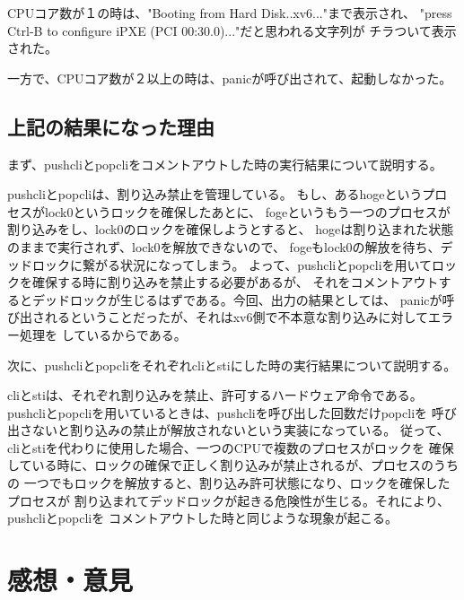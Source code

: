\documentclass[10pt,a4j]{jarticle}
\begin{document}
CPUコア数が１の時は、"Booting from Hard Disk..xv6..."まで表示され、
"press Ctrl-B to configure iPXE (PCI 00:30.0)..."だと思われる文字列が
チラついて表示された。

一方で、CPUコア数が２以上の時は、panicが呼び出されて、起動しなかった。

\subsection{上記の結果になった理由}


まず、pushcliとpopcliをコメントアウトした時の実行結果について説明する。

pushcliとpopcliは、割り込み禁止を管理している。
もし、あるhogeというプロセスがlock0というロックを確保したあとに、
fogeというもう一つのプロセスが割り込みをし、lock0のロックを確保しようとすると、
hogeは割り込まれた状態のままで実行されず、lock0を解放できないので、
fogeもlock0の解放を待ち、デッドロックに繋がる状況になってしまう。
よって、pushcliとpopcliを用いてロックを確保する時に割り込みを禁止する必要があるが、
それをコメントアウトするとデッドロックが生じるはずである。今回、出力の結果としては、
panicが呼び出されるということだったが、それはxv6側で不本意な割り込みに対してエラー処理を
しているからである。


次に、pushcliとpopcliをそれぞれcliとstiにした時の実行結果について説明する。

cliとstiは、それぞれ割り込みを禁止、許可するハードウェア命令である。
pushcliとpopcliを用いているときは、pushcliを呼び出した回数だけpopcliを
呼び出さないと割り込みの禁止が解放されないという実装になっている\cite{doc}。
従って、cliとstiを代わりに使用した場合、一つのCPUで複数のプロセスがロックを
確保している時に、ロックの確保で正しく割り込みが禁止されるが、プロセスのうちの
一つでもロックを解放すると、割り込み許可状態になり、ロックを確保したプロセスが
割り込まれてデッドロックが起きる危険性が生じる。それにより、pushcliとpopcliを
コメントアウトした時と同じような現象が起こる。

\section{感想・意見}

\end{document}
